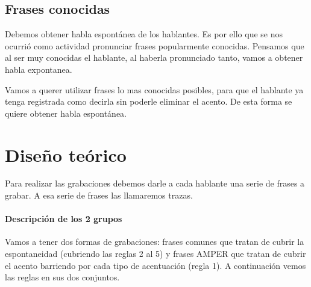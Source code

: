 \documentclass[11pt,a4paper,twoside]{tesis}
\begin{document}


\subsection{Frases conocidas}

Debemos obtener habla espontánea de los hablantes. Es por ello que se nos ocurrió como actividad pronunciar frases popularmente conocidas. Pensamos que al ser muy conocidas el hablante, al haberla pronunciado tanto, vamos a obtener habla expontanea.

Vamos a querer utilizar frases lo mas conocidas posibles, para que el hablante ya tenga registrada como decirla sin poderle eliminar el acento. De esta forma se quiere obtener habla espontánea.

\section{Diseño teórico}

Para realizar las grabaciones debemos darle a cada hablante una serie de frases a grabar. A esa serie de frases las llamaremos trazas.

\paragraph{Descripción de los 2 grupos}

Vamos a tener dos formas de grabaciones: frases comunes que tratan de cubrir la espontaneidad (cubriendo las reglas 2 al 5) y frases AMPER que tratan de cubrir el acento barriendo por cada tipo de acentuación (regla 1). A continuación vemos las reglas en sus dos conjuntos.
\end{document}
